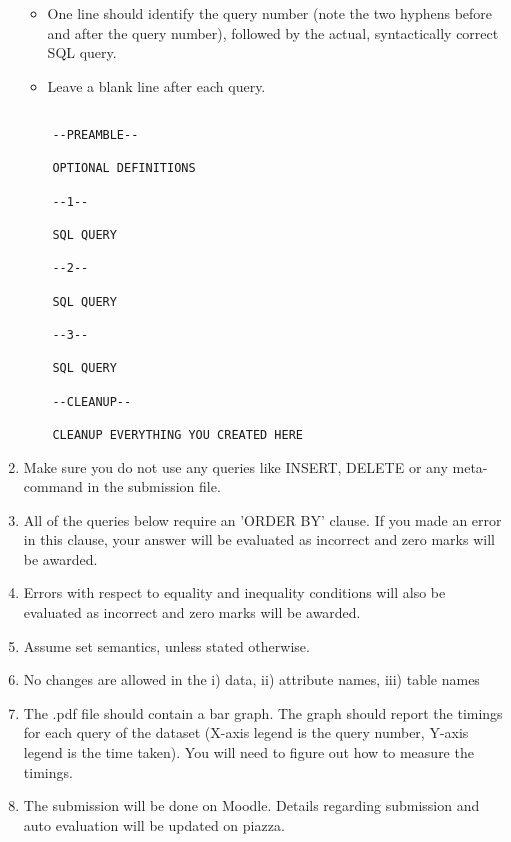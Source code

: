 \documentclass[10pt]{article}
\begin{document}
\begin{enumerate}
\begin{itemize}
    \item One line should identify the query number (note the two hyphens before and after the query number), followed by the actual, syntactically correct SQL query.

    \item Leave a blank line after each query.
\end{itemize}

\begin{verbatim}

    --PREAMBLE--

    OPTIONAL DEFINITIONS

    --1--

    SQL QUERY

    --2--

    SQL QUERY

    --3--

    SQL QUERY

    --CLEANUP--

    CLEANUP EVERYTHING YOU CREATED HERE

\end{verbatim}

\item Make sure you do not use any queries like INSERT, DELETE or any meta-command in the submission file.

\item All of the queries below require an 'ORDER BY' clause. If you made an error in this clause, your answer will be evaluated as incorrect and zero marks will be awarded.

\item Errors with respect to equality and inequality conditions will also be evaluated as incorrect and zero marks will be awarded.

\item Assume set semantics, unless stated otherwise.

\item No changes are allowed in the i) data, ii) attribute names, iii) table names

\item The .pdf file should contain a bar graph. The graph should report the timings for each query of the dataset (X-axis legend is the query number, Y-axis legend is the time taken). You will need to figure out how to measure the timings.

\item The submission will be done on Moodle. Details regarding submission and auto evaluation will be updated on piazza.
\end{enumerate}
\end{document}
